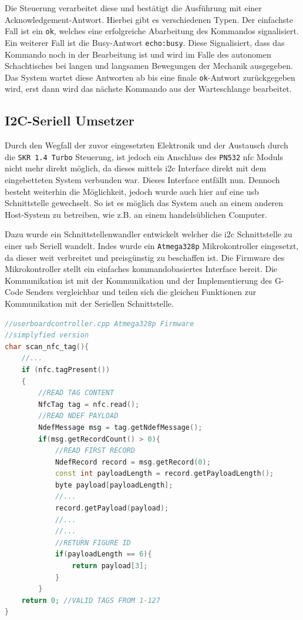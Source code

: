 Die Steuerung verarbeitet diese und bestätigt die Ausführung mit einer
Acknowledgement-Antwort. Hierbei gibt es verschiedenen Typen. Der
einfachste Fall ist ein \passthrough{\lstinline!ok!}, welches eine
erfolgreiche Abarbeitung des Kommandos signalisiert. Ein weiterer Fall
ist die Busy-Antwort \passthrough{\lstinline!echo:busy!}. Diese
Signalisiert, dass das Kommando noch in der Bearbeitung ist und wird im
Falle des autonomen Schachtisches bei langen und langsamen Bewegungen
der Mechanik ausgegeben. Das System wartet diese Antworten ab bis eine
finale \passthrough{\lstinline!ok!}-Antwort zurückgegeben wird, erst
dann wird das nächste Kommando aus der Warteschlange bearbeitet.

\hypertarget{i2c-seriell-umsetzer}{%
\subsection{I2C-Seriell Umsetzer}\label{i2c-seriell-umsetzer}}

Durch den Wegfall der zuvor eingesetzten Elektronik und der Austausch
durch die \passthrough{\lstinline!SKR 1.4 Turbo!} Steuerung, ist jedoch
ein Anschluss des \passthrough{\lstinline!PN532!} \gls{nfc} Moduls nicht
mehr direkt möglich, da dieses mittels \gls{i2c} Interface direkt mit
dem eingebetteten System verbunden war. Dieses Interface entfällt nun.
Dennoch besteht weiterhin die Möglichkeit, jedoch wurde auch hier auf
eine \gls{usb} Schnittstelle gewechselt. So ist es möglich das System
auch an einem anderen Host-System zu betreiben, wie z.B. an einem
handelsüblichen Computer.

Dazu wurde ein Schnittstellenwandler entwickelt welcher die \gls{i2c}
Schnittstelle zu einer \gls{usb} Seriell wandelt. Indes wurde ein
\passthrough{\lstinline!Atmega328p!} Mikrokontroller eingesetzt, da
dieser weit verbreitet und preisgünstig zu beschaffen ist. Die Firmware
des Mikrokontroller stellt ein einfaches kommandobasiertes Interface
bereit. Die Kommunikation ist mit der Kommunikation und der
Implementierung des G-Code Senders vergleichbar und teilen sich die
gleichen Funktionen zur Kommunikation mit der Seriellen Schnittstelle.

\begin{lstlisting}[language={C++}]
//userboardcontroller.cpp Atmega328p Firmware
//simplyfied version
char scan_nfc_tag(){
    //...
    if (nfc.tagPresent())
    {
        //READ TAG CONTENT
        NfcTag tag = nfc.read();
        //READ NDEF PAYLOAD
        NdefMessage msg = tag.getNdefMessage();
        if(msg.getRecordCount() > 0){
            //READ FIRST RECORD
            NdefRecord record = msg.getRecord(0);
            const int payloadLength = record.getPayloadLength();
            byte payload[payloadLength];
            //...
            record.getPayload(payload);
            //...
            //...
            //RETURN FIGURE ID
            if(payloadLength == 6){
                return payload[3];
            }
        }
    return 0; //VALID TAGS FROM 1-127
}
\end{lstlisting}

